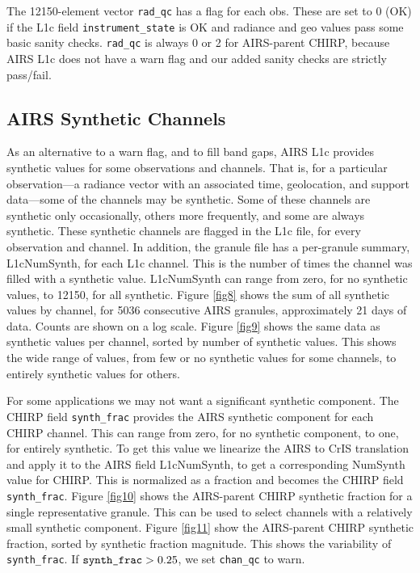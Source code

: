 \documentclass[11pt]{article}
\begin{document}
The 12150-element vector \texttt{rad\_qc} has a flag for each obs.
These are set to 0 (OK) if the L1c field \texttt{instrument\_state}
is OK and radiance and geo values pass some basic sanity checks.
\texttt{rad\_qc} is always 0 or 2 for AIRS-parent CHIRP, because
AIRS L1c does not have a warn flag and our added sanity checks are
strictly pass/fail.

\subsection{AIRS Synthetic Channels}

As an alternative to a warn flag, and to fill band gaps, AIRS L1c
provides synthetic values for some observations and channels.  That
is, for a particular observation---a radiance vector with an
associated time, geolocation, and support data---some of the
channels may be synthetic.  Some of these channels are synthetic
only occasionally, others more frequently, and some are always
synthetic.  These synthetic channels are flagged in the L1c file,
for every observation and channel.  In addition, the granule file
has a per-granule summary, L1cNumSynth, for each L1c channel.  This
is the number of times the channel was filled with a synthetic
value.  L1cNumSynth can range from zero, for no synthetic values, to
12150, for all synthetic.  Figure \ref{fig8} shows the sum of all
synthetic values by channel, for 5036 consecutive AIRS granules,
approximately 21 days of data.  Counts are shown on a log scale.
Figure \ref{fig9} shows the same data as synthetic values per
channel, sorted by number of synthetic values.  This shows the wide
range of values, from few or no synthetic values for some channels,
to entirely synthetic values for others.

For some applications we may not want a significant synthetic
component.  The CHIRP field \texttt{synth\_frac} provides the AIRS
synthetic component for each CHIRP channel.  This can range from
zero, for no synthetic component, to one, for entirely synthetic.
To get this value we linearize the AIRS to CrIS translation and
apply it to the AIRS field L1cNumSynth, to get a corresponding
NumSynth value for CHIRP.  This is normalized as a fraction and
becomes the CHIRP field \texttt{synth\_frac}.  Figure \ref{fig10}
shows the AIRS-parent CHIRP synthetic fraction for a single
representative granule. This can be used to select channels with a
relatively small synthetic component.  Figure \ref{fig11} show the
AIRS-parent CHIRP synthetic fraction, sorted by synthetic fraction
magnitude.  This shows the variability of \texttt{synth\_frac}.  If
$\hbox{\texttt{synth\_frac}} > 0.25$, we set \texttt{chan\_qc} to
warn.
\end{document}
